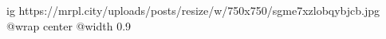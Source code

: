  
 
 
 
 

\ifcmt
  ig https://mrpl.city/uploads/posts/resize/w/750x750/sgme7xzlobqybjcb.jpg
  @wrap center
  @width 0.9
\fi
